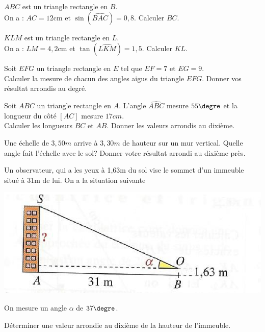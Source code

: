 \begin{exercice}
$ABC$ est un triangle rectangle en $B$.\\
On a : $AC=12$cm et $\sin(\widehat{BAC})=0,8$.
Calculer $BC$.
\end{exercice}

\begin{exercice}
$KLM$ est un triangle rectangle en $L$.\\
On a : $LM=4,2$cm et $\tan(\widehat{LKM})=1,5$.
Calculer $KL$.
\end{exercice}

\begin{exercice}
Soit $EFG$ un triangle rectangle en $E$ tel que $EF=7$ et $EG=9$.\\
Calculer la mesure de chacun des angles aigus du triangle $EFG$. Donner vos résultat arrondis au degré.
\end{exercice}

\begin{exercice}
Soit $ABC$ un triangle rectangle en $A$. L'angle $\widehat{ABC}$ mesure $55\textrm{\degre}$ et la longueur du côté $[AC]$ mesure $17cm$.\\
Calculer les longueurs $BC$ et $AB$. Donner les valeurs arrondis au dixième.
\end{exercice}

\begin{exercice}
Une échelle de $3,50m$ arrive à $3,30m$ de hauteur sur un mur vertical. 
Quelle angle fait l'échelle avec le sol? Donner votre résultat arrondi au dixième près.
\end{exercice}

\begin{exercice}
Un observateur, qui a les yeux à 1,63m du sol vise le sommet d'un immeuble situé à 31m de lui. On a la situation suivante
\begin{center}
\includegraphics[scale=0.7]{Trigonometrie/figures/observateur.eps}
\end{center}
On mesure un angle $\alpha$ de $37\textrm{\degre}$.

Déterminer une valeur arrondie au dixième de la hauteur de l'immeuble.
\end{exercice}

